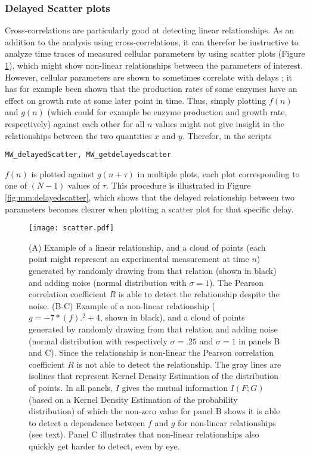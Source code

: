 {\subsubsection{Delayed Scatter plots}

Cross-correlations are particularly good at detecting linear relationships.
As an addition to the analysis using cross-correlations, 
it can therefor be instructive to analyze time traces of measured cellular parameters by using scatter plots (Figure \ref{fig:mm:scatter}), 
which might show non-linear relationships between the parameters of interest. 
%
However, cellular parameters are shown to sometimes correlate with delays \cite{Kiviet2014}; it has for example been shown that the production rates of some enzymes have an effect on growth rate at some later point in time.
Thus, simply plotting $f(n)$ and $g(n)$ (which could for example be enzyme production and growth rate, respectively) against each other for all $n$ values might not give insight in the relationships between the two quantities $x$ and $y$.
Therefor, in the scripts
\begin{verbatim}
MW_delayedScatter, MW_getdelayedscatter
\end{verbatim}
$f(n)$ is plotted against $g(n+\tau)$ in multiple plots, each plot corresponding to one of $(N-1)$ values of $\tau$.
This procedure is illustrated in Figure \ref{fig:mm:delayedscatter}, which shows that the delayed relationship between two parameters becomes clearer when plotting a scatter plot for that specific delay.


\begin{figure}
	\centering
	\texttt{[image: scatter.pdf]}
	\caption{ 
		(A) Example of a linear relationship, and a cloud of points (each point might represent an experimental measurement at time $n$) generated by randomly drawing from that relation (shown in black) and adding noise (normal distribution with $\sigma=1$). The Pearson correlation coefficient $R$ is able to detect the relationship despite the noise.
		(B-C) Example of a non-linear relationship ($g=-7*(f).^2+4$, shown in black), and a cloud of points generated by randomly drawing from that relation and adding noise (normal distribution with respectively $\sigma=.25$ and $\sigma=1$ in panels B and C). Since the relationship is non-linear the Pearson correlation coefficient $R$ is not able to detect the relationship. The gray lines are isolines that represent Kernel Density Estimation of the distribution of points.
		In all panels, $I$ gives the mutual information $I(F;G)$ (based on a Kernel Density Estimation of the probability distribution) of which the non-zero value for panel B shows it is able to detect a dependence between $f$ and $g$ for non-linear relationships (see text). Panel C illustrates that non-linear relationships also quickly get harder to detect, even by eye.
	}
	\label{fig:mm:scatter}
\end{figure}


}
